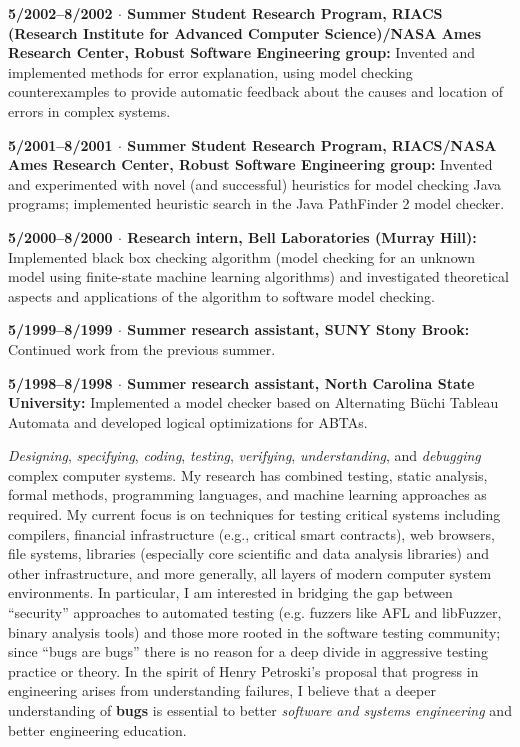 \documentclass[ComputerScience]{vita}
\begin{document}
\begin{vita}
\begin{Experience}
  \item {\bf 5/2002--8/2002 $\cdot$  Summer Student Research Program, RIACS (Research Institute for Advanced Computer Science)/NASA Ames Research Center, Robust Software Engineering group:}  Invented and implemented methods for error explanation, using model checking counterexamples to provide automatic feedback about the causes and location of errors in complex systems.

  \item {\bf 5/2001--8/2001 $\cdot$  Summer Student Research Program, RIACS/NASA Ames Research Center, Robust Software Engineering group:}  Invented and experimented with novel (and successful) heuristics for model checking Java programs; implemented heuristic search in the Java PathFinder 2 model checker.

  \item {\bf 5/2000--8/2000 $\cdot$  Research intern, Bell Laboratories (Murray Hill):}  Implemented black box checking algorithm (model checking for an unknown model using finite-state machine learning algorithms) and investigated theoretical aspects and applications of the algorithm to software model checking.

  \item {\bf 5/1999--8/1999 $\cdot$ Summer research assistant, SUNY Stony Brook:}  Continued work from the previous summer.

  \item {\bf 5/1998--8/1998 $\cdot$ Summer research assistant, North Carolina State University:}   Implemented a model checker based on Alternating B\"uchi Tableau Automata and developed logical optimizations for ABTAs.

\end{Experience}

\begin{Research Interests}
\item \emph{Designing}, \emph{specifying}, \emph{coding},
  \emph{testing}, \emph{verifying}, \emph{understanding}, and
  \emph{debugging} complex computer systems.   My research has combined testing, static analysis, formal methods, programming
  languages, and machine learning approaches as required.  My current
  focus is on techniques for testing critical systems including
  compilers, financial infrastructure (e.g., critical smart
  contracts), web browsers, file systems, libraries (especially core
  scientific and data analysis libraries) and other
  infrastructure, 
  and more generally, all layers of modern computer system
  environments.  In particular, I am interested in bridging the gap
  between ``security'' approaches to automated testing (e.g. fuzzers
  like AFL and libFuzzer, binary analysis tools) and those more rooted in the software
  testing community; since ``bugs are bugs'' there is no reason for a
  deep divide in aggressive testing practice or theory.
  In the spirit of Henry Petroski's proposal that progress in
  engineering arises from understanding failures, I believe that a
  deeper understanding of {\bf bugs} is essential to better
  \emph{software and systems engineering} and better engineering
  education.
\end{Research Interests}



\end{vita}
\end{document}
